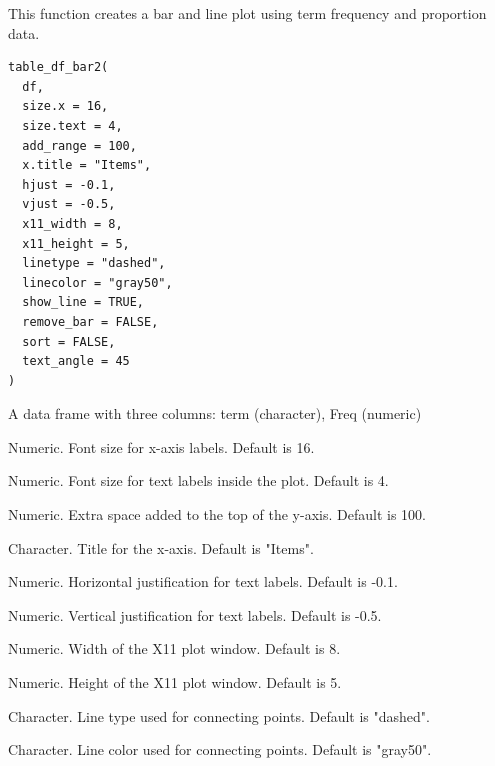 \documentclass[a4paper]{book}
\begin{document}
%
\begin{Description}
This function creates a bar and line plot using term frequency and proportion data.
\end{Description}
%
\begin{Usage}
\begin{verbatim}
table_df_bar2(
  df,
  size.x = 16,
  size.text = 4,
  add_range = 100,
  x.title = "Items",
  hjust = -0.1,
  vjust = -0.5,
  x11_width = 8,
  x11_height = 5,
  linetype = "dashed",
  linecolor = "gray50",
  show_line = TRUE,
  remove_bar = FALSE,
  sort = FALSE,
  text_angle = 45
)
\end{verbatim}
\end{Usage}
%
\begin{Arguments}
\begin{ldescription}
\item[\code{df}] A data frame with three columns: term (character), Freq (numeric)

\item[\code{size.x}] Numeric. Font size for x-axis labels. Default is 16.

\item[\code{size.text}] Numeric. Font size for text labels inside the plot. Default is 4.

\item[\code{add\_range}] Numeric. Extra space added to the top of the y-axis. Default is 100.

\item[\code{x.title}] Character. Title for the x-axis. Default is "Items".

\item[\code{hjust}] Numeric. Horizontal justification for text labels. Default is -0.1.

\item[\code{vjust}] Numeric. Vertical justification for text labels. Default is -0.5.

\item[\code{x11\_width}] Numeric. Width of the X11 plot window. Default is 8.

\item[\code{x11\_height}] Numeric. Height of the X11 plot window. Default is 5.

\item[\code{linetype}] Character. Line type used for connecting points. Default is "dashed".

\item[\code{linecolor}] Character. Line color used for connecting points. Default is "gray50".


\end{ldescription}
\end{Arguments}
\end{document}
